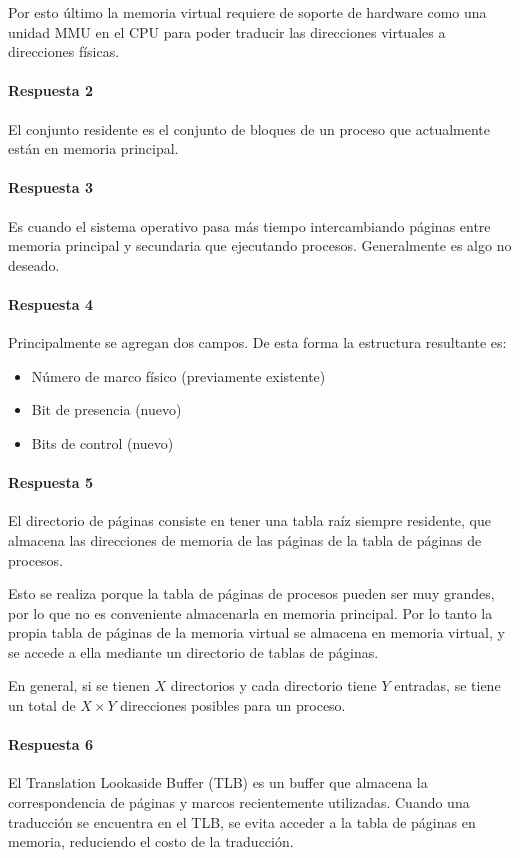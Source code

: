 Por esto último la memoria virtual requiere de soporte de hardware como una unidad MMU en el CPU para poder traducir las direcciones virtuales a direcciones físicas.

\paragraph{Respuesta 2}
El conjunto residente es el conjunto de bloques de un proceso que actualmente están en memoria principal.

\paragraph{Respuesta 3}
Es cuando el sistema operativo pasa más tiempo intercambiando páginas entre memoria principal y secundaria que ejecutando procesos. Generalmente es algo no deseado.

\paragraph{Respuesta 4}
Principalmente se agregan dos campos. De esta forma la estructura resultante es:
\begin{itemize}
  \item Número de marco físico (previamente existente)
  \item Bit de presencia (nuevo)
  \item Bits de control (nuevo)
\end{itemize}

\paragraph{Respuesta 5}
El directorio de páginas consiste en tener una tabla raíz siempre residente, que almacena las direcciones de memoria de las páginas de la tabla de páginas de procesos.

Esto se realiza porque la tabla de páginas de procesos pueden ser muy grandes, por lo que no es conveniente almacenarla en memoria principal. Por lo tanto la propia tabla de páginas de la memoria virtual se almacena en memoria virtual, y se accede a ella mediante un directorio de tablas de páginas.

En general, si se tienen \(X\) directorios y cada directorio tiene \(Y\) entradas, se tiene un total de \(X\times Y\) direcciones posibles para un proceso.

\paragraph{Respuesta 6}
El Translation Lookaside Buffer (TLB) es un buffer que almacena la correspondencia de páginas y marcos recientemente utilizadas. Cuando una traducción se encuentra en el TLB, se evita acceder a la tabla de páginas en memoria, reduciendo el costo de la traducción.

